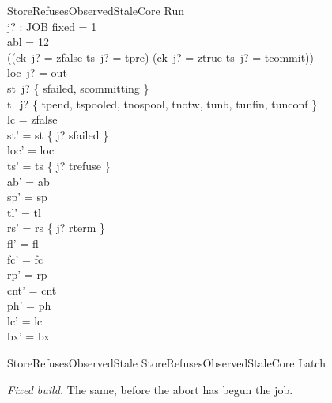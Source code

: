 \documentclass[a4paper,10pt,fleqn]{article}
\begin{document}
\begin{schema}{StoreRefusesObservedStaleCore}
\Delta Run \\ j? : JOB
\where
fixed = 1 \\
abl = 12 \\
((ck~j? = zfalse \land ts~j? = tpre) \lor (ck~j? = ztrue \land ts~j? = tcommit)) \\
loc~j? = out \\
st~j? \in \{ sfailed, scommitting \} \\
tl~j? \in \{ tpend, tspooled, tnospool, tnotw, tunb, tunfin, tunconf \} \\
lc = zfalse \\
st' = st \oplus \{ j? \mapsto sfailed \} \\
loc' = loc \\
ts' = ts \oplus \{ j? \mapsto trefuse \} \\
ab' = ab \\
sp' = sp \\
tl' = tl \\
rs' = rs \oplus \{ j? \mapsto rterm \} \\
fl' = fl \\
fc' = fc \\
rp' = rp \\
cnt' = cnt \\
ph' = ph \\
lc' = lc \\
bx' = bx
\end{schema}

\begin{zed}
StoreRefusesObservedStale  StoreRefusesObservedStaleCore \land Latch
\end{zed}

\emph{Fixed build.} The same, before the abort has begun the job.
\end{document}
